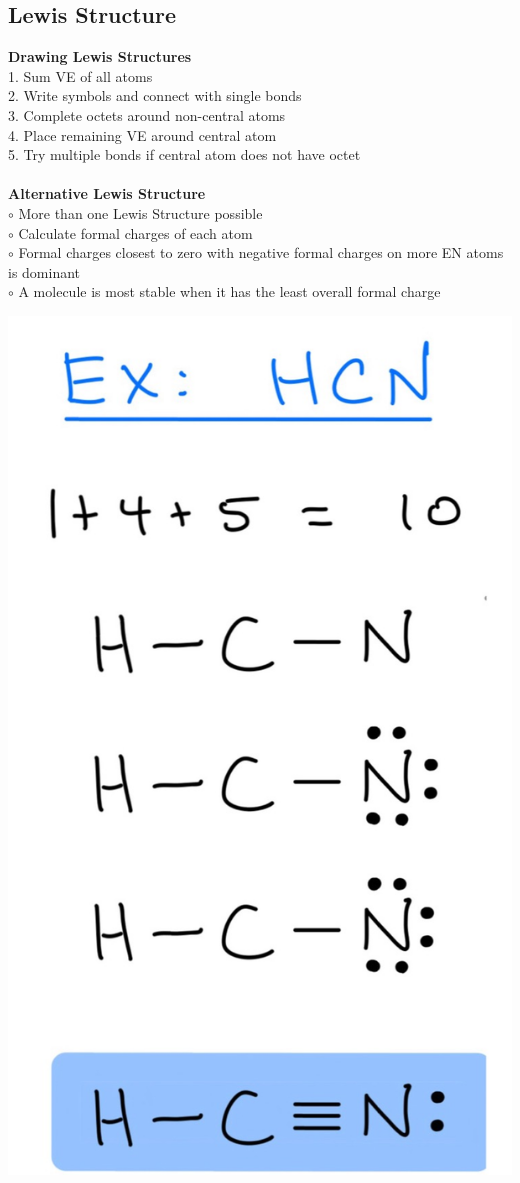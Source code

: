 \subsection{Lewis Structure}
\begin{minipage}{0.49\linewidth}
 \textbf{Drawing Lewis Structures}\\
1. Sum VE of all atoms\\
2. Write symbols and connect with single bonds\\
3. Complete octets around non-central atoms\\
4. Place remaining VE around central atom\\
5. Try multiple bonds if central atom does not have octet\\
\vspace{3pt}\\
\textbf{Alternative Lewis Structure}\\
$\circ$ More than one Lewis Structure possible\\
$\circ$ Calculate formal charges of each atom\\
$\circ$ Formal charges closest to zero with negative formal charges on more EN atoms is dominant\\
$\circ$ A molecule is most stable when it has the least overall formal charge\\
\end{minipage}
\begin{minipage}{0.24\linewidth}
      \includegraphics[width = 0.6\linewidth]{images/Lewis_Structure_HCN.jpeg}
      \\
      \\
\end{minipage}

